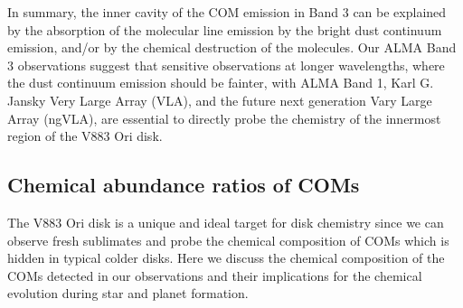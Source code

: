 \documentclass[linenumbers, twocolumn, twocolappendix, astrosymb, times]{aastex631}
\begin{document}

In summary, the inner cavity of the COM emission in Band 3 can be explained by the absorption of the molecular line emission by the bright dust continuum emission, and/or by the chemical destruction of the molecules. Our ALMA Band 3 observations suggest that sensitive observations at longer wavelengths, where the dust continuum emission should be fainter, with ALMA Band 1, Karl G. Jansky Very Large Array (VLA), and the future next generation Vary Large Array (ngVLA), are essential to directly probe the chemistry of the innermost region of the V883 Ori disk.

\subsection{Chemical abundance ratios of COMs}\label{subsec:abundance_ratio}
The V883 Ori disk is a unique and ideal target for disk chemistry since we can observe fresh sublimates and probe the chemical composition of COMs which is hidden in typical colder disks. Here we discuss the chemical composition of the COMs detected in our observations and their implications for the chemical evolution during star and planet formation. 
\end{document}
